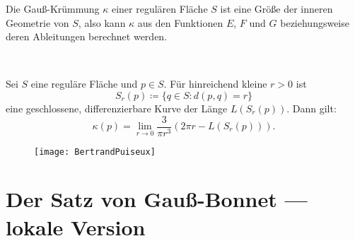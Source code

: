 \begin{example}
\begin{enumerate}
  \end{enumerate}
\end{example}

\begin{theorem}
  Die Gauß-Krümmung \( \kappa \) einer regulären Fläche \( S \) ist eine Größe der inneren Geometrie von \( S \), also kann \( \kappa \) aus den Funktionen \( E \), \( F \) und \( G \) beziehungsweise deren Ableitungen berechnet werden.
\end{theorem}

\begin{theorem}
  \

  \begin{minipage}{.625\textwidth}
    Sei \( S \) eine reguläre Fläche und \( p \in S \). Für hinreichend kleine \( r > 0 \) ist
    \begin{equation*}
      S_r(p) \coloneqq \{ q \in S : d(p,q) = r \}
    \end{equation*}
    eine geschlossene, differenzierbare Kurve der Länge \( L(S_r(p)) \). Dann gilt:
    \begin{equation*}
      \kappa(p) = \lim_{r \to 0} \frac{3}{\pi r^3}(2\pi r - L(S_r(p)))\text{.}
    \end{equation*}
  \end{minipage}
  \hfill
  \begin{minipage}{.35\textwidth}
    \begin{figure}[H]
      \texttt{[image: BertrandPuiseux]}
    \end{figure}
  \end{minipage}
\end{theorem}

\section{Der Satz von Gauß-Bonnet --- lokale Version}

